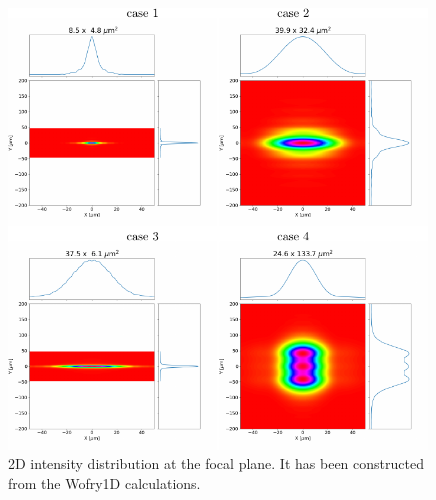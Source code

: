 \documentclass{iucr}              %
\begin{document}
\begin{figure}\label{fig:2DWofry1D}
    \includegraphics[width=0.99\textwidth]{figures/fig_wofry.pdf}
    \caption{2D intensity distribution at the focal plane. It has been constructed from the Wofry1D calculations.
    }
\end{figure}


\vspace{1cm}




\newpage
\end{document}
